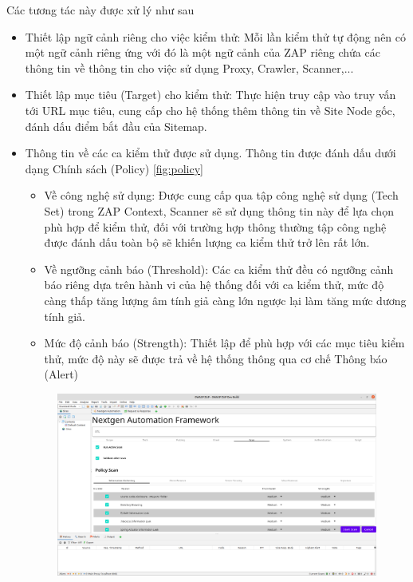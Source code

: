 \documentclass[./../main.tex]{subfiles}
\begin{document}
Các tương tác này được xử lý như sau
\begin{itemize}
	\item Thiết lập ngữ cảnh riêng cho việc kiểm thử: Mỗi lần kiểm
	      thử tự động nên có một ngữ cảnh riêng ứng với đó là một ngữ cảnh
	      của ZAP riêng chứa các thông tin về thông tin cho việc sử dụng
	      Proxy, Crawler, Scanner,...
	\item Thiết lập mục tiêu (Target) cho kiểm thử: Thực hiện truy cập
	      vào truy vấn tới URL mục tiêu, cung cấp cho hệ thống thêm thông tin
	      về Site Node gốc, đánh dấu điểm bắt đầu của Sitemap.
	\item Thông tin về các ca kiểm thử được sử dụng. Thông tin được
	      đánh dấu dưới dạng Chính sách (Policy) \ref{fig:policy}
	      \begin{itemize}
		      \item Về công nghệ sử dụng: Được cung cấp qua tập công
		            nghệ sử dụng (Tech Set) trong ZAP Context, Scanner sẽ
		            sử dụng thông tin này để lựa chọn phù hợp để kiểm thử,
		            đối với trường hợp thông thường tập công nghệ được
		            đánh dấu toàn bộ sẽ khiến lượng ca kiểm thử trở lên rất lớn.
		      \item Về ngưỡng cảnh báo (Threshold): Các ca kiểm thử đều có ngưỡng
		            cảnh báo riêng dựa trên hành vi của hệ thống đối với ca
		            kiểm thử, mức độ càng thấp tăng lượng âm tính giả càng
		            lớn ngược lại làm tăng mức dương tính giả.
		      \item Mức độ cảnh báo (Strength): Thiết lập để phù hợp với các mục
		            tiêu kiểm thử, mức độ này sẽ được trả về hệ thống thông
		            qua cơ chế Thông báo (Alert)
	      \end{itemize}
	      \begin{figure}[h!]
		      \includegraphics[width=\linewidth]{./images/policy.png}

\end{figure}
\end{itemize}
\end{document}
